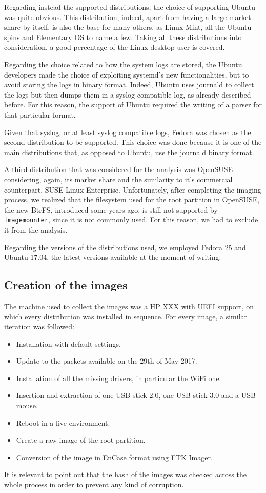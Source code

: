 \documentclass[a4paper]{article}
\begin{document}
Regarding instead the supported distributions, the choice of supporting Ubuntu
was quite obvious. This distribution, indeed, apart from having a large market
share by itself, is also the base for many others, as Linux Mint, all the Ubuntu
spins and Elementary OS to name a few. Taking all these distributions into
consideration, a good percentage of the Linux desktop user is covered.

Regarding the choice related to how the system logs are stored, the Ubuntu
developers made the choice of exploiting systemd's new functionalities, but to
avoid storing the logs in binary format. Indeed, Ubuntu uses journald to
collect the logs but then dumps them in a syslog compatible log, as already
described before. For this reason, the support of Ubuntu required the writing of
a parser for that particular format.

Given that syslog, or at least syslog compatible logs, Fedora was chosen as the
second distribution to be supported. This choice was done because it is one of
the main distributions that, as opposed to Ubuntu, use the journald binary
format.

A third distribution that was considered for the analysis was OpenSUSE
considering, again, its market share and the similarity to it's commercial
counterpart, SUSE Linux Enterprise. Unfortunately, after completing the imaging
process, we realized that the filesystem used for the root partition in
OpenSUSE, the new BtrFS, introduced some years ago, is still not supported by
\texttt{imagemounter}, since it is not commonly used. For this reason, we had to
exclude it from the analysis.

Regarding the versions of the distributions used, we employed Fedora 25 and
Ubuntu 17.04, the latest versions available at the moment of writing.

\subsection{Creation of the images}
\label{sec:images}
The machine used to collect the images was a HP XXX with UEFI support, on which
every distribution was installed in sequence. For every image, a similar
iteration was followed:
\begin{itemize}
\item Installation with default settings.
\item Update to the packets available on the 29th of May 2017.
\item Installation of all the missing drivers, in particular the WiFi one.
\item Insertion and extraction of one USB stick 2.0, one USB stick 3.0 and a USB
	mouse.
\item Reboot in a live environment.
\item Create a raw image of the root partition.
\item Conversion of the image in EnCase format using FTK Imager.
\end{itemize}
It is relevant to point out that the hash of the images was checked across the
whole process in order to prevent any kind of corruption.
\end{document}
